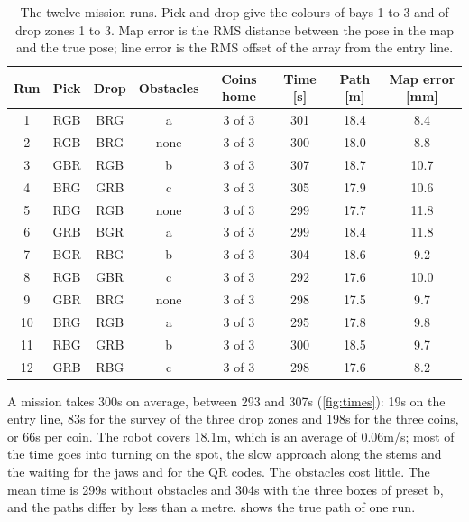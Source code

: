 \begin{table}[htbp]
  \centering
  \caption{The twelve mission runs. Pick and drop give the colours of bays 1 to 3 and of
  drop zones 1 to 3. Map error is the RMS distance between the pose in the map and the true
  pose; line error is the RMS offset of the array from the entry line.}
  \label{tab:runs}
  \begin{tabular}{@{}cccccccc@{}}
    \toprule
    Run & Pick & Drop & Obstacles & Coins home & Time [s] & Path [m] & Map error [mm] \\
    \midrule
    1 & RGB & BRG & a & 3 of 3 & 301 & 18.4 & 8.4 \\
    2 & RGB & BRG & none & 3 of 3 & 300 & 18.0 & 8.8 \\
    3 & GBR & RGB & b & 3 of 3 & 307 & 18.7 & 10.7 \\
    4 & BRG & GRB & c & 3 of 3 & 305 & 17.9 & 10.6 \\
    5 & RBG & RGB & none & 3 of 3 & 299 & 17.7 & 11.8 \\
    6 & GRB & BGR & a & 3 of 3 & 299 & 18.4 & 11.8 \\
    7 & BGR & RBG & b & 3 of 3 & 304 & 18.6 & 9.2 \\
    8 & RGB & GBR & c & 3 of 3 & 292 & 17.6 & 10.0 \\
    9 & GBR & BRG & none & 3 of 3 & 298 & 17.5 & 9.7 \\
    10 & BRG & RGB & a & 3 of 3 & 295 & 17.8 & 9.8 \\
    11 & RBG & GRB & b & 3 of 3 & 300 & 18.5 & 9.7 \\
    12 & GRB & RBG & c & 3 of 3 & 298 & 17.6 & 8.2 \\
    \bottomrule
  \end{tabular}
\end{table}

A mission takes 300\unit{s} on average, between 293 and 307\unit{s} (\cref{fig:times}): 19\unit{s}
on the entry line, 83\unit{s} for the survey of the three drop zones and 198\unit{s} for the
three coins, or 66\unit{s} per coin. The robot covers 18.1\unit{m}, which is an average of
0.06\unit{m/s}; most of the time goes into turning on the spot, the slow approach along the
stems and the waiting for the jaws and for the QR codes. The obstacles cost little. The
mean time is 299\unit{s} without obstacles and 304\unit{s} with the three boxes of
preset b, and the paths differ by less than a metre.  shows the true path of
one run.

\figpath
\figtimes

